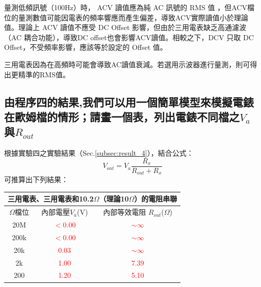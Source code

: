 \documentclass[12pt,a4paper]{article}
\begin{document}
\begin{CJK}{UTF8}{bkai}
量測低頻訊號（100Hz）時， ACV 讀值應為純 AC 訊號的 RMS 值 ，但ACV檔位的量測數值可能因電表的頻率響應而產生偏差，導致ACV實際讀值小於理論值。理論上 ACV 讀值不應受 DC Offset 影響，但由於三用電表缺乏高通濾波（AC 耦合功能），導致DC offset也會影響ACV讀值。相較之下，DCV 只取 DC Offset，不受頻率影響，應該等於設定的 Offset 值。

三用電表因為在高頻時可能會導致AC讀值衰減。若選用示波器進行量測，則可得出更精準的RMS值。

\clearpage
\subsection{由程序四的結果,我們可以用一個簡單模型來模擬電錶在歐姆檔的情形；請畫一個表，列出電錶不同檔之$V_{a}$與$R_{out}$}\label{subsec:4}
\hfill

根據實驗四之實驗結果（Sec.\ref{subsec:result_4}），結合公式：
\begin{equation}
\label{eq:va_rout}
    V_{out} = V_{a} \frac{R_{x}}{R_{out}+R_{x}}
\end{equation}
可推算出下列結果：

\begin{center}
    \begin{tabular}{c|c|c}
    \multicolumn{3}{c}{三用電表、三用電表和10.2$\Omega$（理論10$\Omega$）的電阻串聯}\\
    \hline
    \hline
    $\Omega$檔位  &  內部電壓$V_{a}$(V)   &   內部等效電阻
    $R_{out}$($\Omega$)\\
    \hline
    \hline
    20M &   \textcolor{red}{$<$0.00}    &   \textcolor{red}{$\sim\infty$}\\\hline
    200k    &   \textcolor{red}{$<$0.00}    &   \textcolor{red}{$\sim\infty$}\\\hline
    20k    &   \textcolor{red}{0.03}    &   \textcolor{red}{$\sim\infty$}\\\hline
    2k    &   \textcolor{red}{1.00}    &   \textcolor{red}{7.39}\\\hline
    200    &   \textcolor{red}{1.20}    &   \textcolor{red}{5.10}\\\hline
    \end{tabular}
\end{center}


\end{CJK}
\end{document}

